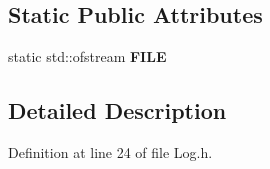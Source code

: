 \subsection*{Static Public Attributes}
\begin{DoxyCompactItemize}
\item 
static std\+::ofstream {\bfseries F\+I\+LE}\hypertarget{class_global_1_1_log_aaa59f5763a558afe6e1843848067b29a}{}\label{class_global_1_1_log_aaa59f5763a558afe6e1843848067b29a}

\end{DoxyCompactItemize}


\subsection{Detailed Description}


Definition at line 24 of file Log.\+h.

